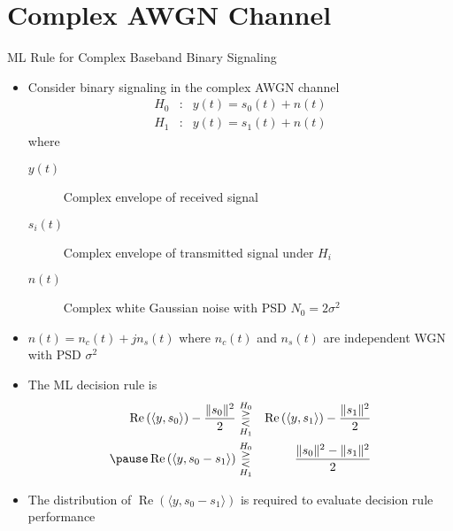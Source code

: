 \documentclass[t]{beamer}
\renewcommand\Re{\operatorname{Re}}
\begin{document}
\section{Complex AWGN Channel}
\begin{frame}{ML Rule for Complex Baseband Binary Signaling}
  \footnotesize
  \begin{itemize}
    \item \pause Consider binary signaling in the complex AWGN channel
      \begin{equation*}
        \begin{array}{ccc}
            H_0 & : & y(t) = s_0(t) + n(t) \\
            H_1 & : & y(t) = s_1(t) + n(t) 
        \end{array}
      \end{equation*}
      \pause where 
      \begin{description}
        \item[$y(t)$] Complex envelope of received signal
        \pause
        \item[$s_i(t)$] Complex envelope of transmitted signal under $H_i$
        \pause
        \item[$n(t)$] Complex white Gaussian noise with PSD $N_0 = 2\sigma^2$
      \end{description}
    \item \pause $n(t) = n_c(t) + jn_s(t)$ where $n_c(t)$ and $n_s(t)$ are independent WGN with PSD $\sigma^2$
    \item \pause The ML decision rule is \pause
      \begin{eqnarray*}
        \Re\left(\langle y, s_0 \rangle\right) - \frac{\lVert s_0 \rVert^2}{2} & \overset{H_0}{\underset{H_1}{\gtreqless}} & \Re\left(\langle y, s_1 \rangle\right) - \frac{\lVert s_1 \rVert^2}{2} \\ \pause
        \Re\left(\langle y, s_0  - s_1\rangle\right)   & \overset{H_0}{\underset{H_1}{\gtreqless}} & \frac{\lVert s_0 \rVert^2 - \lVert s_1 \rVert^2}{2}
      \end{eqnarray*}
  \item \pause The distribution of $\Re\left(\langle y, s_0 - s_1 \rangle\right)$ is required to evaluate decision rule performance
  \end{itemize}
  \normalsize
\end{frame}
\end{document}
